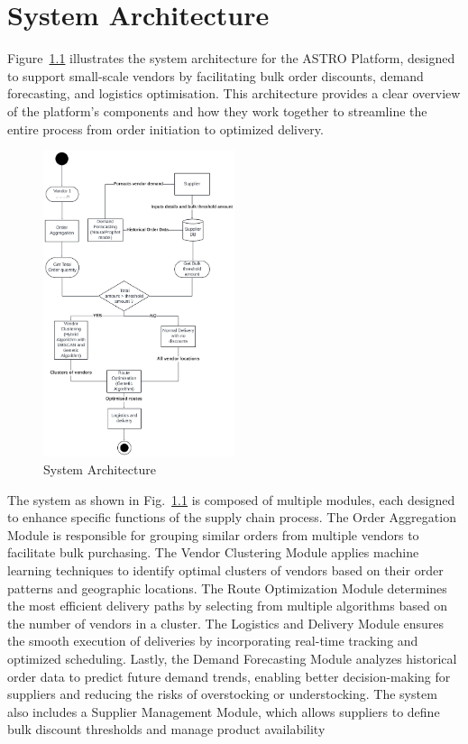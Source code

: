 \chapter{System Architecture}

\noindent Figure~\ref{fig:architecture} illustrates the system architecture for the ASTRO Platform, designed to support small-scale vendors by facilitating bulk order discounts, demand forecasting, and logistics optimisation. This architecture provides a clear overview of the platform’s components and how they work together to streamline the entire process from order initiation to optimized delivery.

\begin{figure}[h]
    \centering
    \includegraphics[width=0.5\textwidth]{Figures/sys_arch.pdf}
    \caption{System Architecture}
    \label{fig:architecture}
\end{figure}

\par The system as shown in Fig.~\ref{fig:architecture} is composed of multiple modules, each designed to enhance specific functions of the supply chain process. The Order Aggregation Module is responsible for grouping similar orders from multiple vendors to facilitate bulk purchasing. The Vendor Clustering Module applies machine learning techniques to identify optimal clusters of vendors based on their order patterns and geographic locations. The Route Optimization Module determines the most efficient delivery paths by selecting from multiple algorithms based on the number of vendors in a cluster. The Logistics and Delivery Module ensures the smooth execution of deliveries by incorporating real-time tracking and optimized scheduling. Lastly, the Demand Forecasting Module analyzes historical order data to predict future demand trends, enabling better decision-making for suppliers and reducing the risks of overstocking or understocking. The system also includes a Supplier Management Module, which allows suppliers to define bulk discount thresholds and manage product availability


